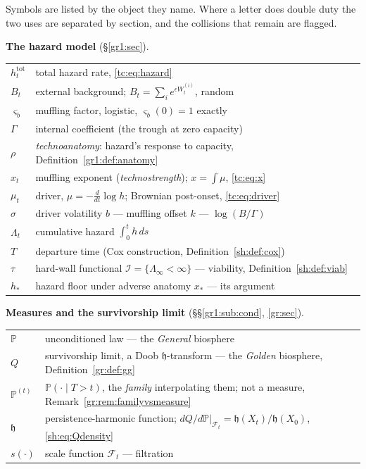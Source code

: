 \documentclass[11pt]{article}
\numberwithin{equation}{section}
\theoremstyle{plain}
\theoremstyle{definition}
\theoremstyle{remark}
\newcommand{\PP}{\mathbb{P}}
\newcommand{\Imm}{\mathcal{I}}
\newcommand{\Fc}{\mathcal{F}}
\newcommand{\hm}{\mathfrak{h}}
\begin{document}
\noindent Symbols are listed by the object they name. Where a letter does
double duty the two uses are separated by section, and the collisions
that remain are flagged.

\smallskip
\noindent\textbf{The hazard model} (\S\ref{gr1:sec}).
\begin{center}\small
\begin{tabular}{@{}ll@{}}
\toprule
$h^{\mathrm{tot}}_t$ & total hazard rate, \eqref{tc:eq:hazard}\\
$B_t$ & external background; $B_t=\sum_i e^{\epsilon W^{(i)}_t}$, random\\
$\varsigma_b$ & muffling factor, logistic, $\varsigma_b(0)=1$ exactly\\
$\Gamma$ & internal coefficient (the trough at zero capacity)\\
$\rho$ & \emph{technoanatomy}: hazard's response to capacity,
Definition~\ref{gr1:def:anatomy}\\
$x_t$ & muffling exponent (\emph{technostrength}); $x=\int\mu$,
\eqref{tc:eq:x}\\
$\mu_t$ & driver, $\mu=-\tfrac{d}{dt}\log h$; Brownian post-onset,
\eqref{tc:eq:driver}\\
$\sigma$ & driver volatility \qquad $b$ --- muffling offset \qquad
$k$ --- $\log(B/\Gamma)$\\
$\Lambda_t$ & cumulative hazard $\int_0^t h\,ds$\\
$T$ & departure time (Cox construction, Definition~\ref{sh:def:cox})\\
$\tau$ & hard-wall functional \qquad $\Imm=\{\Lambda_\infty<\infty\}$ ---
viability, Definition~\ref{sh:def:viab}\\
$h_\ast$ & hazard floor under adverse anatomy \qquad $x_\ast$ --- its
argument\\
\bottomrule
\end{tabular}
\end{center}

\smallskip
\noindent\textbf{Measures and the survivorship limit}
(\S\S\ref{gr1:sub:cond}, \ref{gr:sec}).
\begin{center}\small
\begin{tabular}{@{}ll@{}}
\toprule
$\PP$ & unconditioned law --- the \emph{General} biosphere\\
$Q$ & survivorship limit, a Doob $\hm$-transform --- the \emph{Golden}
biosphere, Definition~\ref{gr:def:gg}\\
$\PP^{(t)}$ & $\PP(\cdot\mid T>t)$, the \emph{family} interpolating them;
not a measure, Remark~\ref{gr:rem:familyvsmeasure}\\
$\hm$ & persistence-harmonic function; $dQ/d\PP|_{\Fc_t}=\hm(X_t)/\hm(X_0)$,
\eqref{sh:eq:Qdensity}\\
$s(\cdot)$ & scale function \qquad $\Fc_t$ --- filtration\\
\bottomrule
\end{tabular}
\end{center}
\end{document}
